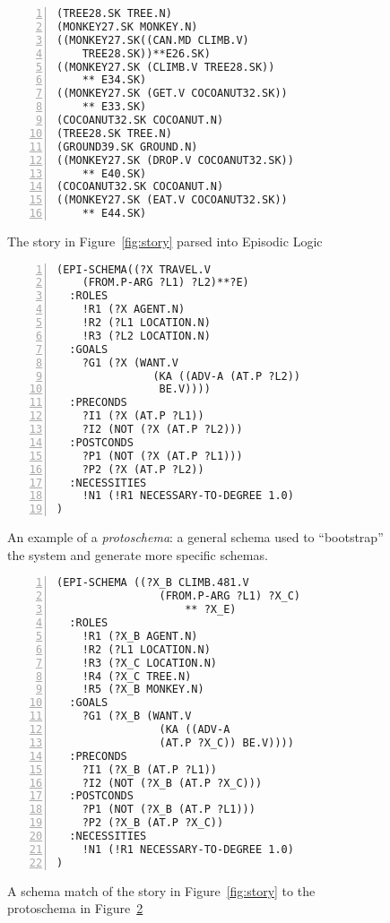 \begin{figure}[htbp]
        \begin{lstlisting}[frame=single,numbers=left,numberstyle=\tiny,xleftmargin=1.5em,style=Schemas]
(TREE28.SK TREE.N)
(MONKEY27.SK MONKEY.N)
((MONKEY27.SK((CAN.MD CLIMB.V)
    TREE28.SK))**E26.SK)
((MONKEY27.SK (CLIMB.V TREE28.SK))
    ** E34.SK)
((MONKEY27.SK (GET.V COCOANUT32.SK))
    ** E33.SK)
(COCOANUT32.SK COCOANUT.N)
(TREE28.SK TREE.N)
(GROUND39.SK GROUND.N)
((MONKEY27.SK (DROP.V COCOANUT32.SK))
    ** E40.SK)
(COCOANUT32.SK COCOANUT.N)
((MONKEY27.SK (EAT.V COCOANUT32.SK))
    ** E44.SK)\end{lstlisting}
    \caption{The story in Figure~\ref{fig:story} parsed into Episodic Logic}
    \label{fig:story_parse}
\end{figure}

\begin{figure}[htbp]
    \begin{lstlisting}[frame=single,numbers=left,numberstyle=\tiny,xleftmargin=1.5em,style=Schemas]
(EPI-SCHEMA((?X TRAVEL.V
    (FROM.P-ARG ?L1) ?L2)**?E)
  :ROLES
    !R1 (?X AGENT.N)
    !R2 (?L1 LOCATION.N)
    !R3 (?L2 LOCATION.N)
  :GOALS
    ?G1 (?X (WANT.V
               (KA ((ADV-A (AT.P ?L2))
                BE.V))))
  :PRECONDS
    ?I1 (?X (AT.P ?L1))
    ?I2 (NOT (?X (AT.P ?L2)))
  :POSTCONDS
    ?P1 (NOT (?X (AT.P ?L1)))
    ?P2 (?X (AT.P ?L2))
  :NECESSITIES
    !N1 (!R1 NECESSARY-TO-DEGREE 1.0)
)\end{lstlisting}
    \caption{An example of a \textit{protoschema}: a general schema used to ``bootstrap'' the system and generate more specific schemas.}
    \label{fig:protoschema}
\end{figure}

\begin{figure}[htbp]
    \begin{lstlisting}[frame=single,numbers=left,numberstyle=\tiny,xleftmargin=1.5em,style=Schemas]
(EPI-SCHEMA ((?X_B CLIMB.481.V
                (FROM.P-ARG ?L1) ?X_C)
                    ** ?X_E)
  :ROLES
    !R1 (?X_B AGENT.N)
    !R2 (?L1 LOCATION.N)
    !R3 (?X_C LOCATION.N)
    !R4 (?X_C TREE.N)
    !R5 (?X_B MONKEY.N)
  :GOALS
    ?G1 (?X_B (WANT.V
                (KA ((ADV-A
                (AT.P ?X_C)) BE.V))))
  :PRECONDS
    ?I1 (?X_B (AT.P ?L1))
    ?I2 (NOT (?X_B (AT.P ?X_C)))
  :POSTCONDS
    ?P1 (NOT (?X_B (AT.P ?L1)))
    ?P2 (?X_B (AT.P ?X_C))
  :NECESSITIES
    !N1 (!R1 NECESSARY-TO-DEGREE 1.0)
)\end{lstlisting}
    \caption{A schema match of the story in Figure~\ref{fig:story} to the protoschema in Figure~\ref{fig:protoschema}}
    \label{fig:schema_match}
\end{figure}

